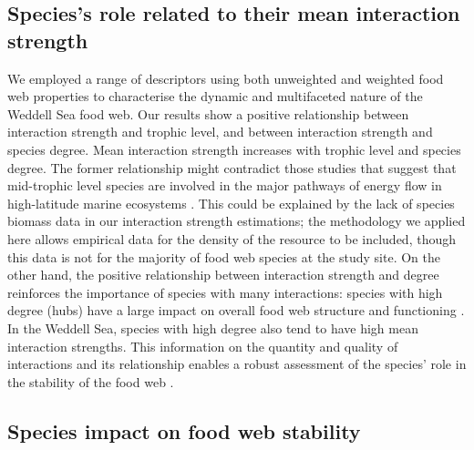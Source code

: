 \documentclass[gc, manuscript]{copernicus}
\begin{document}
\subsection{Species's role related to their mean interaction strength}

We employed a range of descriptors using both unweighted and weighted
food web properties to characterise the dynamic and multifaceted nature
of the Weddell Sea food web. Our results show a positive relationship
between interaction strength and trophic level, and between interaction
strength and species degree. Mean interaction strength increases with
trophic level and species degree. The former relationship might
contradict those studies that suggest that mid-trophic level species are
involved in the major pathways of energy flow in high-latitude marine
ecosystems
\citep{Pinkerton2014, Murphy2016, McCormack2020, Riccialdelli2020}. This
could be explained by the lack of species biomass data in our
interaction strength estimations; the methodology we applied here
\citep{Pawar2012} allows empirical data for the density of the resource
to be included, though this data is not for the majority of food web
species at the study site. On the other hand, the positive relationship
between interaction strength and degree reinforces the importance of
species with many interactions: species with high degree (hubs) have a
large impact on overall food web structure and functioning
\citep{Dunne2002a, Kortsch2015}. In the Weddell Sea, species with high
degree also tend to have high mean interaction strengths. This
information on the quantity and quality of interactions and its
relationship enables a robust assessment of the species' role in the
stability of the food web \citep{Cirtwill2018a}.

\subsection{Species impact on food web stability}
\end{document}
